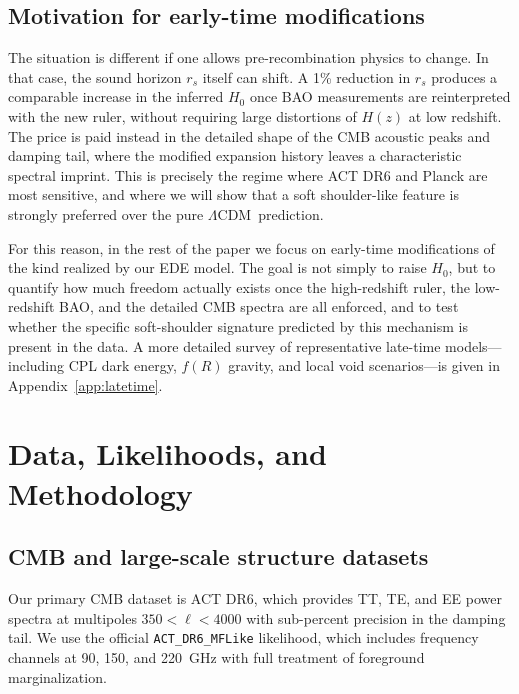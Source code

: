 \documentclass[twocolumn,showpacs,preprintnumbers,amsmath,amssymb,prd]{revtex4-2}
\newcommand{\lcdm}{$\Lambda$CDM}
\begin{document}
\subsection{Motivation for early-time modifications}

The situation is different if one allows pre-recombination physics to change. 
In that case, the sound horizon $r_s$ itself can shift. A 1\% reduction in $r_s$ 
produces a comparable increase in the inferred $H_0$ once BAO measurements are 
reinterpreted with the new ruler, without requiring large distortions of $H(z)$ 
at low redshift. The price is paid instead in the detailed shape of the CMB 
acoustic peaks and damping tail, where the modified expansion history leaves 
a characteristic spectral imprint. This is precisely the regime where ACT DR6 
and Planck are most sensitive, and where we will show that a soft shoulder-like 
feature is strongly preferred over the pure \lcdm\ prediction.

For this reason, in the rest of the paper we focus on early-time modifications 
of the kind realized by our EDE model. The goal is not simply to raise $H_0$, 
but to quantify how much freedom actually exists once the high-redshift ruler, 
the low-redshift BAO, and the detailed CMB spectra are all enforced, and to 
test whether the specific soft-shoulder signature predicted by this mechanism 
is present in the data. A more detailed survey of representative late-time 
models---including CPL dark energy, $f(R)$ gravity, and local void scenarios---is 
given in Appendix~\ref{app:latetime}.

\section{Data, Likelihoods, and Methodology}
\label{sec:data}

\subsection{CMB and large-scale structure datasets}

Our primary CMB dataset is ACT DR6, which provides TT, TE, and EE power spectra 
at multipoles $350 < \ell < 4000$ with sub-percent precision in the damping tail. 
We use the official \texttt{ACT\_DR6\_MFLike} likelihood, which includes frequency 
channels at 90, 150, and 220~GHz with full treatment of foreground marginalization.
\end{document}
